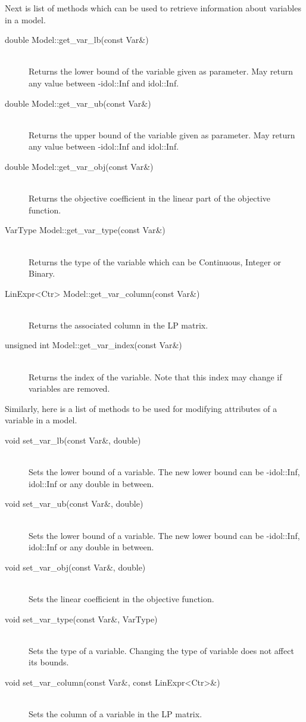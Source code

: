 Next is list of methods which can be used to retrieve information about
variables in a model.
%
\begin{description}
    \item[\textsf{double Model::get\_var\_lb(const Var\&)}]\hphantom{.}\\
    Returns the lower bound of the variable given as parameter. May return any
    value between \textsf{-idol::Inf} and \textsf{idol::Inf}.
    \item[\textsf{double Model::get\_var\_ub(const Var\&)}]\hphantom{.}\\
    Returns the upper bound of the variable given as parameter. May return any
    value between \textsf{-idol::Inf} and \textsf{idol::Inf}.
    \item[\textsf{double Model::get\_var\_obj(const Var\&)}]\hphantom{.}\\
    Returns the objective coefficient in the linear part of the objective
    function.
    \item[\textsf{VarType Model::get\_var\_type(const Var\&)}]\hphantom{.}\\
    Returns the type of the variable which can be \textsf{Continuous},
    \textsf{Integer} or \textsf{Binary}.
    \item[\textsf{LinExpr<Ctr> Model::get\_var\_column(const Var\&)}]\hphantom{.}\\
    Returns the associated column in the LP matrix.
    \item[\textsf{unsigned int Model::get\_var\_index(const Var\&)}]\hphantom{.}\\
    Returns the index of the variable. Note that this index may change if
    variables are removed.
\end{description}

Similarly, here is a list of methods to be used for modifying attributes of a
variable in a model.
%
\begin{description}
    \item[\textsf{void set\_var\_lb(const Var\&, double)}]\hphantom{.}\\ 
    Sets the lower bound of a variable. The new lower bound can be
    \textsf{-idol::Inf}, \textsf{idol::Inf} or any double in between. 
    \item[\textsf{void set\_var\_ub(const Var\&, double)}]\hphantom{.}\\ 
    Sets the lower bound of a variable. The new lower bound can be
    \textsf{-idol::Inf}, \textsf{idol::Inf} or any double in between. 
    \item[\textsf{void set\_var\_obj(const Var\&, double)}]\hphantom{.}\\ 
    Sets the linear coefficient in the objective function. 
    \item[\textsf{void set\_var\_type(const Var\&, VarType)}]\hphantom{.}\\ 
    Sets the type of a variable. Changing the type of variable does not affect its bounds. 
    \item[\textsf{void set\_var\_column(const Var\&, const LinExpr<Ctr>\&)}]\hphantom{.}\\ 
    Sets the column of a variable in the LP matrix. 
\end{description}

